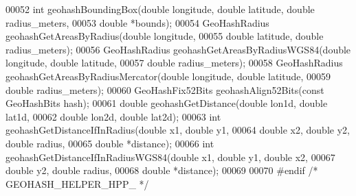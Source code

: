 \begin{DoxyCode}
00052 \textcolor{keywordtype}{int} geohashBoundingBox(\textcolor{keywordtype}{double} longitude, \textcolor{keywordtype}{double} latitude, \textcolor{keywordtype}{double} radius\_meters,
00053                         \textcolor{keywordtype}{double} *bounds);
00054 GeoHashRadius geohashGetAreasByRadius(\textcolor{keywordtype}{double} longitude,
00055                                       \textcolor{keywordtype}{double} latitude, \textcolor{keywordtype}{double} radius\_meters);
00056 GeoHashRadius geohashGetAreasByRadiusWGS84(\textcolor{keywordtype}{double} longitude, \textcolor{keywordtype}{double} latitude,
00057                                            \textcolor{keywordtype}{double} radius\_meters);
00058 GeoHashRadius geohashGetAreasByRadiusMercator(\textcolor{keywordtype}{double} longitude, \textcolor{keywordtype}{double} latitude,
00059                                               \textcolor{keywordtype}{double} radius\_meters);
00060 GeoHashFix52Bits geohashAlign52Bits(\textcolor{keyword}{const} GeoHashBits hash);
00061 \textcolor{keywordtype}{double} geohashGetDistance(\textcolor{keywordtype}{double} lon1d, \textcolor{keywordtype}{double} lat1d,
00062                           \textcolor{keywordtype}{double} lon2d, \textcolor{keywordtype}{double} lat2d);
00063 \textcolor{keywordtype}{int} geohashGetDistanceIfInRadius(\textcolor{keywordtype}{double} x1, \textcolor{keywordtype}{double} y1,
00064                                  \textcolor{keywordtype}{double} x2, \textcolor{keywordtype}{double} y2, \textcolor{keywordtype}{double} radius,
00065                                  \textcolor{keywordtype}{double} *distance);
00066 \textcolor{keywordtype}{int} geohashGetDistanceIfInRadiusWGS84(\textcolor{keywordtype}{double} x1, \textcolor{keywordtype}{double} y1, \textcolor{keywordtype}{double} x2,
00067                                       \textcolor{keywordtype}{double} y2, \textcolor{keywordtype}{double} radius,
00068                                       \textcolor{keywordtype}{double} *distance);
00069 
00070 \textcolor{preprocessor}{#}\textcolor{preprocessor}{endif} \textcolor{comment}{/* GEOHASH\_HELPER\_HPP\_ */}
\end{DoxyCode}
